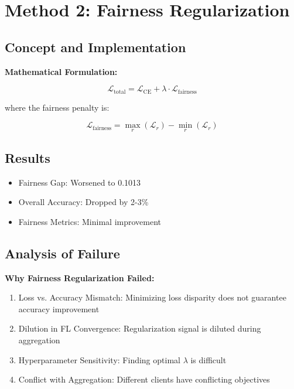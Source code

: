 \documentclass[11pt,a4paper]{report}
\begin{document}
\section{Method 2: Fairness Regularization}

\subsection{Concept and Implementation}

\textbf{Mathematical Formulation:}

\begin{equation}
\mathcal{L}_{\text{total}} = \mathcal{L}_{\text{CE}} + \lambda \cdot \mathcal{L}_{\text{fairness}}
\end{equation}

where the fairness penalty is:

\begin{equation}
\mathcal{L}_{\text{fairness}} = \max_r(\mathcal{L}_r) - \min_r(\mathcal{L}_r)
\end{equation}

\subsection{Results}

\begin{itemize}
    \item Fairness Gap: Worsened to 0.1013
    \item Overall Accuracy: Dropped by 2-3\%
    \item Fairness Metrics: Minimal improvement
\end{itemize}

\subsection{Analysis of Failure}

\textbf{Why Fairness Regularization Failed:}
\begin{enumerate}
    \item Loss vs. Accuracy Mismatch: Minimizing loss disparity does not guarantee accuracy improvement
    \item Dilution in FL Convergence: Regularization signal is diluted during aggregation
    \item Hyperparameter Sensitivity: Finding optimal $\lambda$ is difficult
    \item Conflict with Aggregation: Different clients have conflicting objectives
\end{enumerate}
\end{document}
